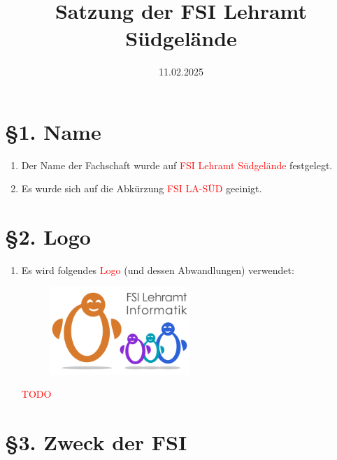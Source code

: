 \documentclass[a4paper,12pt]{article}
\title{Satzung der FSI Lehramt Südgelände}
\date{11.02.2025}
\newcommand{\red}[1]{\textcolor{red}{#1}}
\begin{document}
\maketitle

\section*{§1. Name}

\begin{enumerate}
    \item Der Name der Fachschaft wurde auf \red{FSI Lehramt Südgelände} festgelegt.
    \item Es wurde sich auf die Abkürzung \red{FSI LA-SÜD} geeinigt.
\end{enumerate}

\section*{§2. Logo}

\begin{enumerate}
	\item
		Es wird folgendes \red{Logo} (und dessen Abwandlungen) verwendet:
		\begin{figure}[h]
			\includegraphics[width=0.5\textwidth]{img/logo.png}
		\end{figure}

		\red{TODO}
\end{enumerate}

\section*{§3. Zweck der FSI}
\end{document}
